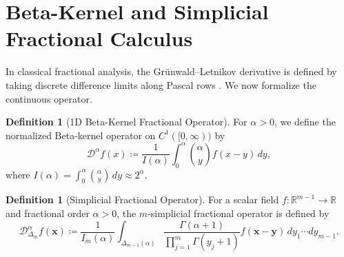 \documentclass[11pt,a4paper]{article}
\theoremstyle{plain}
\theoremstyle{definition}
\newtheorem{definition}[theorem]{Definition}
\theoremstyle{remark}
\numberwithin{equation}{section}
\begin{document}
\section{Beta-Kernel and Simplicial Fractional Calculus}

In classical fractional analysis, the Grünwald--Letnikov derivative is defined by taking discrete difference limits along Pascal rows \cite{podlubny1998, samko1993}. We now formalize the continuous operator.

\begin{definition}[1D Beta-Kernel Fractional Operator]
For $\alpha > 0$, we define the normalized Beta-kernel operator on $C^1([0, \infty))$ by
\begin{equation}
\mathcal{D}^\alpha f(x) \coloneqq \frac{1}{I(\alpha)}\int_0^\alpha \binom{\alpha}{y} f(x - y)\,dy,
\end{equation}
where $I(\alpha) = \int_0^\alpha \binom{\alpha}{y}\,dy \approx 2^\alpha$.
\end{definition}

\begin{definition}[Simplicial Fractional Operator]
For a scalar field $f: \mathbb{R}^{m-1} \to \mathbb{R}$ and fractional order $\alpha > 0$, the $m$-simplicial fractional operator is defined by
\begin{equation}
\mathcal{D}_{\Delta_m}^\alpha f(\mathbf{x}) \coloneqq \frac{1}{I_m(\alpha)}\int_{\Delta_{m-1}(\alpha)} \frac{\Gamma(\alpha+1)}{\prod_{j=1}^m \Gamma(y_j+1)} f(\mathbf{x} - \mathbf{y})\,dy_1 \cdots dy_{m-1}.
\end{equation}
\end{definition}
\end{document}
